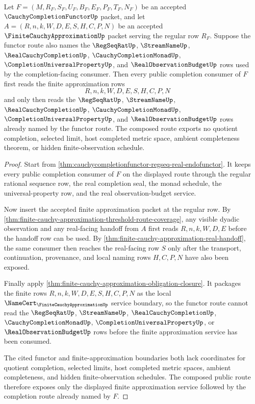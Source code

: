 \begin{theorem}
\label{thm:cauchycompletionfunctor-finite-approximation-route}
Let $F=(M,R_F,S_F,U_F,B_F,E_F,P_F,T_F,N_F)$ be an accepted $\CauchyCompletionFunctorUp$ packet, and let $A=(R,n,k,W,D,E,S,H,C,P,N)$ be an accepted $\FiniteCauchyApproximationUp$ packet serving the regular row $R_F$. Suppose the functor route also names the $\RegSeqRatUp$, $\StreamNameUp$, $\RealCauchyCompletionUp$, $\CauchyCompletionMonadUp$, $\CompletionUniversalPropertyUp$, and $\RealObservationBudgetUp$ rows used by the completion-facing consumer. Then every public completion consumer of $F$ first reads the finite approximation rows
$$
R,n,k,W,D,E,S,H,C,P,N
$$
and only then reads the $\RegSeqRatUp$, $\StreamNameUp$, $\RealCauchyCompletionUp$, $\CauchyCompletionMonadUp$, $\CompletionUniversalPropertyUp$, and $\RealObservationBudgetUp$ rows already named by the functor route. The composed route exports no quotient completion, selected limit, host completed metric space, ambient completeness theorem, or hidden finite-observation schedule.
\end{theorem}
\begin{proof}
Start from \autoref{thm:cauchycompletionfunctor-regseq-real-endofunctor}. It keeps every public completion consumer of $F$ on the displayed route through the regular rational sequence row, the real completion seal, the monad schedule, the universal-property row, and the real observation-budget service.

Now insert the accepted finite approximation packet at the regular row. By \autoref{thm:finite-cauchy-approximation-threshold-route-coverage}, any visible dyadic observation and any real-facing handoff from $A$ first reads $R,n,k,W,D,E$ before the handoff row can be used. By \autoref{thm:finite-cauchy-approximation-real-handoff}, the same consumer then reaches the real-facing row $S$ only after the transport, continuation, provenance, and local naming rows $H,C,P,N$ have also been exposed.

Finally apply \autoref{thm:finite-cauchy-approximation-obligation-closure}. It packages the finite rows $R,n,k,W,D,E,S,H,C,P,N$ as the local $\NameCert_{\FiniteCauchyApproximationUp}$ service boundary, so the functor route cannot read the $\RegSeqRatUp$, $\StreamNameUp$, $\RealCauchyCompletionUp$, $\CauchyCompletionMonadUp$, $\CompletionUniversalPropertyUp$, or $\RealObservationBudgetUp$ rows before the finite approximation service has been consumed.

The cited functor and finite-approximation boundaries both lack coordinates for quotient completion, selected limits, host completed metric spaces, ambient completeness, and hidden finite-observation schedules. The composed public route therefore exposes only the displayed finite approximation service followed by the completion route already named by $F$.
\end{proof}

